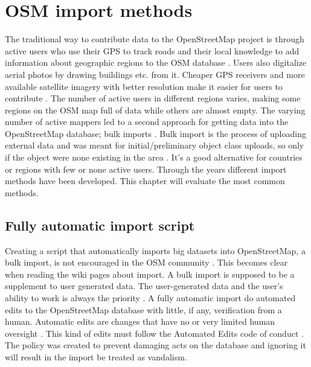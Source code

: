  \chapter{OSM import methods}\label{ch:importmethods}

The traditional way to contribute data to the OpenStreetMap project is through active users who use their GPS to track roads and their local knowledge to add information about geographic regions to the OSM database \cite{Zielstra2013}. Users also digitalize aerial photos by drawing buildings etc. from it. Cheaper GPS receivers and more available satellite imagery with better resolution make it easier for users to contribute \cite{Chilton}. The number of active users in different regions varies, making some regions on the OSM map full of data while others are almost empty. The varying number of active mappers led to a second approach for getting data into the OpenStreetMap database; bulk imports \cite{Zielstra2013}.  Bulk import is the process of uploading external data and was meant for initial/preliminary object class uploads, so only if the object were none existing in the area  \cite{Zielstra2013}.  It's a good alternative for countries or regions with few or none active users. Through the years different import methods have been developed. This chapter will evaluate the most common methods. 

\section{Fully automatic import script}
Creating a script that automatically imports big datasets into OpenStreetMap, a bulk import, is not encouraged in the OSM community \cite{Zielstra2013}. This becomes clear when reading the wiki pages about import. A bulk import is supposed to be a supplement to user generated data. The user-generated data and the user's ability to work is always the priority \cite{OSMimport}. A fully automatic import do automated edits to the OpenStreetMap database with little, if any, verification from a human. Automatic edits are changes that have no or very limited human oversight \cite{OSMAutiEdit}. This kind of edits must follow the Automated Edits code of conduct \cite{OSMAutomaticEdits}. The policy was created to prevent damaging acts on the database and ignoring it will result in the import be treated as vandalism. 

